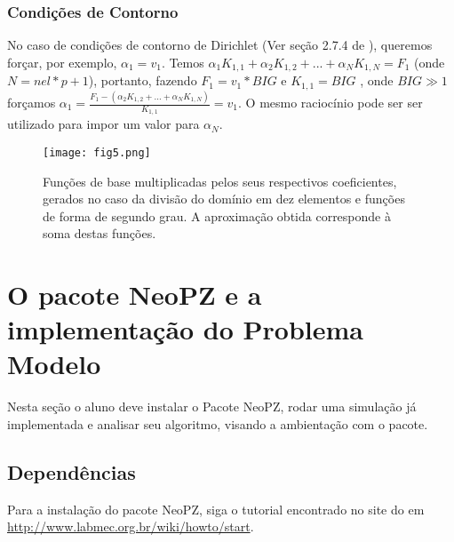 \documentclass[11pt, oneside, hidelinks]{article}   	%
\begin{document}
\subsubsection{Condições de Contorno}
No caso de condições de contorno de Dirichlet (Ver seção 2.7.4 de \citet{oden81}), queremos forçar, por exemplo, $\alpha_{1}=v_{1}$. Temos $\alpha_{1}K_{1,1}+\alpha_{2}K_{1,2}+...+\alpha_{N}
K_{1,N}=F_{1}$ (onde $N=nel*p+1$), portanto,  fazendo $F_{1}=v_{1}*BIG$ e $K_{1,1}=BIG$ , onde $BIG\gg1$ forçamos $\alpha_{1}=\frac{F_{1}-(\alpha_{2}K_{1,2}+...+\alpha_{N}K_{1,N})}{K_{1,1}}=v_{1}$. O mesmo raciocínio pode ser ser utilizado para impor um valor para $\alpha_{N}$.
  \begin{figure}[h!]
  \centering
      \texttt{[image: fig5.png]}
  \caption{Funções de base multiplicadas pelos seus respectivos coeficientes, gerados no caso da divisão do domínio em dez elementos e funções de forma de segundo grau. A aproximação obtida corresponde à soma destas funções.}
  \label{fig:basisfunctions}
\end{figure}
\newpage
\section{O pacote NeoPZ e a implementação do Problema Modelo}
Nesta seção o aluno deve instalar o Pacote NeoPZ, rodar uma simulação já implementada e analisar seu algoritmo, visando a ambientação com o pacote.
\subsection{Dependências}
Para a instalação do pacote NeoPZ, siga o tutorial encontrado no site do \cite{website:labmec} em \url{http://www.labmec.org.br/wiki/howto/start}.
\end{document}
